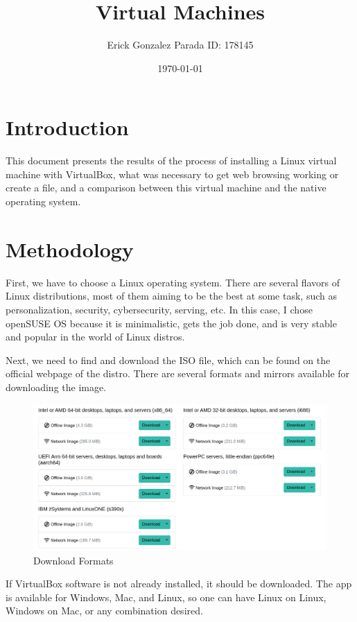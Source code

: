 \documentclass{article}
\title{Virtual Machines}
\author{Erick Gonzalez Parada ID: 178145}
\date{\today}
\begin{document}
\maketitle

\section{Introduction}
This document presents the results of the process of installing a Linux virtual machine with VirtualBox, what was necessary to get web browsing working or create a file, and a comparison between this virtual machine and the native operating system.

\section{Methodology}
First, we have to choose a Linux operating system. There are several flavors of Linux distributions, most of them aiming to be the best at some task, such as personalization, security, cybersecurity, serving, etc. In this case, I chose openSUSE OS because it is minimalistic, gets the job done, and is very stable and popular in the world of Linux distros.

Next, we need to find and download the ISO file, which can be found on the official webpage of the distro. There are several formats and mirrors available for downloading the image.

\begin{figure}[H]
	\centering
	\includegraphics[width=1\textwidth]{iso.png}
	\caption{Download Formats}
	\label{fig:1}
\end{figure}

If VirtualBox software is not already installed, it should be downloaded. The app is available for Windows, Mac, and Linux, so one can have Linux on Linux, Windows on Mac, or any combination desired.
\end{document}
